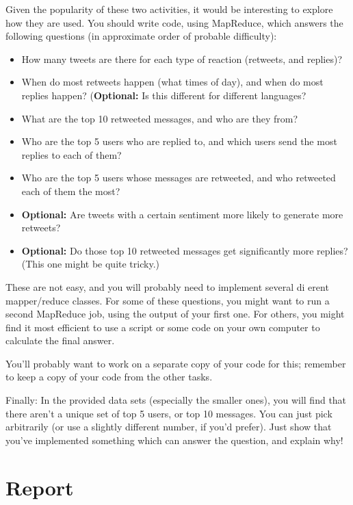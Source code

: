\documentclass[a4paper,10pt]{article}
\begin{document}
  Given the popularity of these two activities, it would be interesting to explore how they are used. You should write code, using MapReduce, which answers the following questions (in approximate order of probable difficulty):
  
  \begin{itemize}
    \item How many tweets are there for each type of reaction (retweets, and replies)?
    \item When do most retweets happen (what times of day), and when do most replies happen? (\textbf{Optional:} Is this different for different languages?
    \item What are the top 10 retweeted messages, and who are they from? 
    \item Who are the top 5 users who are replied to, and which users send the most replies to each of them? 
    \item Who are the top 5 users whose messages are retweeted, and who retweeted each of them the most?
    \item \textbf{Optional:} Are tweets with a certain sentiment more likely to generate more retweets?
    \item \textbf{Optional:} Do those top 10 retweeted messages get significantly more replies? (This one might be quite tricky.)
  \end{itemize}
  
  These are not easy, and you will probably need to implement several di erent mapper/reduce classes. For some of these questions, you might want to run a second MapReduce job, using the output of your first one. For others, you might find it most efficient to use a script or some code on your own computer to calculate the final answer.
  
  You'll probably want to work on a separate copy of your code for this; remember to keep a copy of your code from the other tasks.
  
  Finally: In the provided data sets (especially the smaller ones), you will find that there aren't a unique set of top 5 users, or top 10 messages. You can just pick arbitrarily (or use a slightly different number, if you'd prefer). Just show that you've implemented something which can answer the question, and explain why!
  
  
  \section{Report} \label{sec:report}
  
\end{document}
